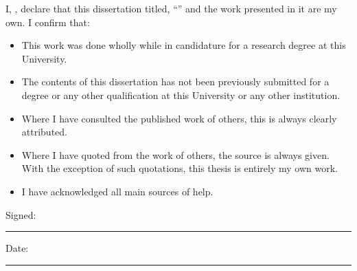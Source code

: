 \documentclass[
12pt, %
english, %
singlespacing, %
parskip, %
headsepline, %
]{MastersDoctoralThesis} %
\numberwithin{theorem}{section}
\numberwithin{remark}{section}
\numberwithin{assumption}{section}
\begin{document}
\begin{declaration}
\addchaptertocentry{\authorshipname} 
\vspace{1.5cm}

\noindent I, \authorname, declare that this dissertation titled, \enquote{\ttitle} and the work presented in it are my own. I confirm that:

\begin{itemize} 
\item This work was done wholly while in candidature for a research degree at this University.
\item The contents of this dissertation has not been previously submitted for a degree or any other qualification at this University or any other institution.
\item Where I have consulted the published work of others, this is always clearly attributed.
\item Where I have quoted from the work of others, the source is always given. With the exception of such quotations, this thesis is entirely my own work.
\item I have acknowledged all main sources of help.
\end{itemize}

\vspace{1cm}
\noindent Signed:\\
\rule[0.5em]{25em}{0.5pt} %
 
\noindent Date:\\
\rule[0.5em]{25em}{0.5pt} %
\end{declaration}

\cleardoublepage

\end{document}
